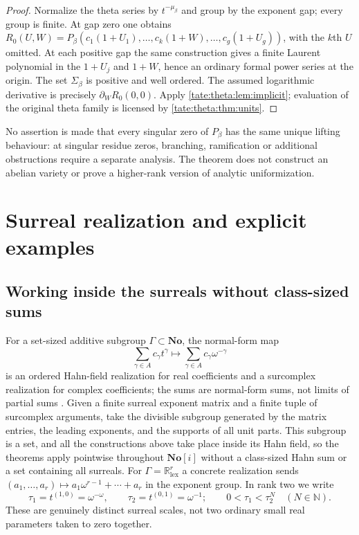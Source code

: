 \documentclass[11pt,letterpaper]{article}
\theoremstyle{definition}
\newcommand{\R}{\mathbb R}
\newcommand{\N}{\mathbb N}
\newcommand{\No}{\mathbf{No}}
\newcommand{\lex}{\mathrm{lex}}
\begin{document}
\begin{proof}
Normalize the theta series by $t^{-\mu_\beta}$ and group by the exponent
gap; every group is finite. At gap zero one obtains
$R_0(U,W)=P_\beta(c_1(1+U_1),\ldots,c_k(1+W),\ldots,c_g(1+U_g))$, with the
$k$th $U$ omitted. At each positive gap the same construction gives a
finite Laurent polynomial in the $1+U_j$ and $1+W$, hence an ordinary
formal power series at the origin. The set $\Sigma_\beta$ is positive and
well ordered. The assumed logarithmic derivative is precisely
$\partial_WR_0(0,0)$. Apply \cref{tate:theta:lem:implicit}; evaluation of
the original theta family is licensed by \cref{tate:theta:thm:units}.
\end{proof}

No assertion is made that every singular zero of $P_\beta$ has the same
unique lifting behaviour: at singular residue zeros, branching,
ramification or additional obstructions require a separate analysis. The
theorem does not construct an abelian variety or prove a higher-rank
version of analytic uniformization.

\section{Surreal realization and explicit examples}\label{tate:theta:sec:examples}

\subsection{Working inside the surreals without class-sized sums}

For a set-sized additive subgroup $\Gamma\subset\No$, the normal-form map
\begin{equation}
 \sum_{\gamma\in A}c_\gamma t^\gamma\longmapsto
 \sum_{\gamma\in A}c_\gamma\omega^{-\gamma}\label{tate:theta:eq:normalembedding}
\end{equation}
is an ordered Hahn-field realization for real coefficients and a
surcomplex realization for complex coefficients; the sums are normal-form
sums, not limits of partial sums \cite{BournezGuilmant}. Given a finite
surreal exponent matrix and a finite tuple of surcomplex arguments, take the
divisible subgroup generated by the matrix entries, the leading exponents,
and the supports of all unit parts. This subgroup is a set, and all the
constructions above take place inside its Hahn field, so the theorems apply
pointwise throughout $\No[i]$ without a class-sized Hahn sum or a set
containing all surreals. For $\Gamma=\R^r_{\lex}$ a concrete realization
sends $(a_1,\ldots,a_r)\mapsto a_1\omega^{r-1}+\cdots+a_r$ in the exponent
group. In rank two we write
\[
 \tau_1=t^{(1,0)}=\omega^{-\omega},\qquad
 \tau_2=t^{(0,1)}=\omega^{-1};\qquad
 0<\tau_1<\tau_2^N\quad(N\in\N).
\]
These are genuinely distinct surreal scales, not two ordinary small real
parameters taken to zero together.
\end{document}
